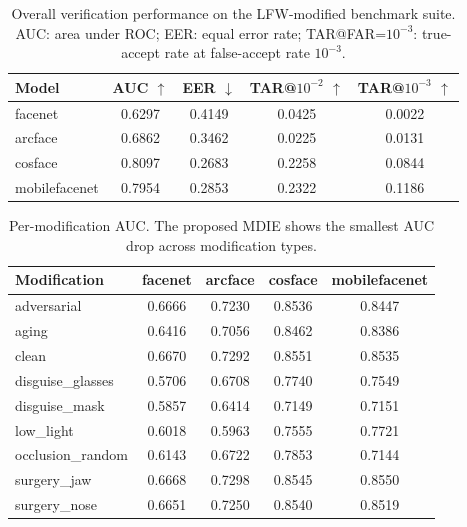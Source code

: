 \begin{table}[t]
\centering
\caption{Overall verification performance on the LFW-modified benchmark suite. AUC: area under ROC; EER: equal error rate; TAR@FAR=$10^{-3}$: true-accept rate at false-accept rate $10^{-3}$.}
\label{tab:overall}
\begin{tabular}{lcccc}
\hline
Model & AUC $\uparrow$ & EER $\downarrow$ & TAR@$10^{-2}$ $\uparrow$ & TAR@$10^{-3}$ $\uparrow$ \\
\hline
facenet & 0.6297 & 0.4149 & 0.0425 & 0.0022 \\
arcface & 0.6862 & 0.3462 & 0.0225 & 0.0131 \\
cosface & 0.8097 & 0.2683 & 0.2258 & 0.0844 \\
mobilefacenet & 0.7954 & 0.2853 & 0.2322 & 0.1186 \\
\hline
\end{tabular}
\end{table}

\begin{table}[t]
\centering
\caption{Per-modification AUC. The proposed MDIE shows the smallest AUC drop across modification types.}
\label{tab:permod}
\begin{tabular}{lcccc}
\hline
Modification & facenet & arcface & cosface & mobilefacenet \\
\hline
adversarial & 0.6666 & 0.7230 & 0.8536 & 0.8447 \\
aging & 0.6416 & 0.7056 & 0.8462 & 0.8386 \\
clean & 0.6670 & 0.7292 & 0.8551 & 0.8535 \\
disguise_glasses & 0.5706 & 0.6708 & 0.7740 & 0.7549 \\
disguise_mask & 0.5857 & 0.6414 & 0.7149 & 0.7151 \\
low_light & 0.6018 & 0.5963 & 0.7555 & 0.7721 \\
occlusion_random & 0.6143 & 0.6722 & 0.7853 & 0.7144 \\
surgery_jaw & 0.6668 & 0.7298 & 0.8545 & 0.8550 \\
surgery_nose & 0.6651 & 0.7250 & 0.8540 & 0.8519 \\
\hline
\end{tabular}
\end{table}
